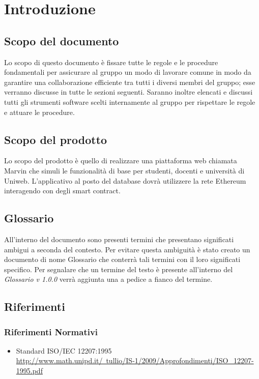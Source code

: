 \documentclass[NormeDiProgetto.tex]{subfiles}
\begin{document}
\chapter{Introduzione}

\section{Scopo del documento}
Lo scopo di questo documento è fissare tutte le regole e le procedure fondamentali per assicurare al gruppo un modo di lavorare comune in modo da garantire una collaborazione efficiente tra tutti i diversi membri del gruppo; esse verranno discusse in tutte le sezioni seguenti. Saranno inoltre elencati e discussi tutti gli strumenti software scelti internamente al gruppo per rispettare le regole e attuare le procedure.
\section{Scopo del prodotto}
Lo scopo del prodotto è quello di realizzare una piattaforma web chiamata Marvin che simuli le funzionalità di base per studenti, docenti e università di Uniweb. L'applicativo al posto del database dovrà utilizzere la rete Ethereum interagendo con degli smart contract.
\section{Glossario}
All'interno del documento sono presenti termini che presentano significati ambigui a seconda del contesto. Per evitare questa ambiguità è stato creato un documento di nome Glossario che conterrà tali termini con il loro significati specifico. Per segnalare che un termine del testo è presente all'interno del \textit{Glossario v 1.0.0} verrà aggiunta una \citGloss{} a pedice a fianco del termine.
\section{Riferimenti}
\subsection{Riferimenti Normativi}
\begin{itemize}
	\item Standard ISO/IEC 12207:1995\\ \href{http://www.math.unipd.it/~tullio/IS-1/2009/Approfondimenti/ISO\_12207-1995.pdf}{http://www.math.unipd.it/~tullio/IS-1/2009/Approfondimenti/ISO\_12207-1995.pdf}
\end{itemize}
\end{document}
